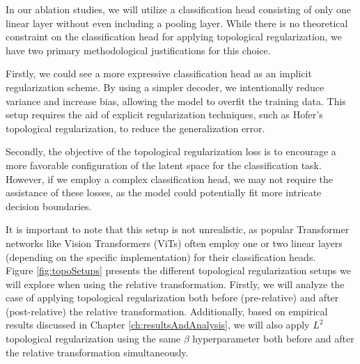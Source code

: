 \documentclass[../main.tex]{subfiles}
\begin{document}
In our ablation studies, we will utilize a classification head consisting of only one linear layer without even including a pooling layer. While there is no theoretical constraint on the classification head for applying topological regularization, we have two primary methodological justifications for this choice.

Firstly, we could see a more expressive classification head as an implicit regularization scheme. By using a simpler decoder, we intentionally reduce variance and increase bias, allowing the model to overfit the training data. This setup requires the aid of explicit regularization techniques, such as Hofer's topological regularization, to reduce the generalization error.

Secondly, the objective of the topological regularization loss is to encourage a more favorable configuration of the latent space for the classification task. However, if we employ a complex classification head, we may not require the assistance of these losses, as the model could potentially fit more intricate decision boundaries.

It is important to note that this setup is not unrealistic, as popular Transformer networks like Vision Transformers (ViTs) \cite{dosovitskiy_image_2021} often employ one or two linear layers (depending on the specific implementation) for their classification heads.\\


Figure \ref{fig:topoSetups} presents the different topological regularization setups we will explore when using the relative transformation. Firstly, we will analyze the case of applying topological regularization both before (pre-relative) and after (post-relative) the relative transformation. Additionally, based on empirical results discussed in Chapter \ref{ch:resultsAndAnalysis}, we will also apply $L^2$ topological regularization using the same $\beta$ hyperparameter both before and after the relative transformation simultaneously.
\end{document}
